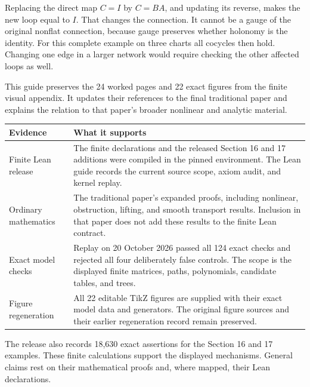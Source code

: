 Replacing the direct map $C=I$ by $C=BA$, and updating its reverse, makes the new loop equal to $I$. That changes the connection. It cannot be a gauge of the original nonflat connection, because gauge preserves whether holonomy is the identity. For this complete example on three charts all cocycles then hold. Changing one edge in a larger network would require checking the other affected loops as well.


This guide preserves the 24 worked pages and 22 exact figures from the finite visual appendix. It updates their references to the final traditional paper and explains the relation to that paper's broader nonlinear and analytic material.

{\small
\begin{tabularx}{\linewidth}{@{}p{.24\linewidth}Y@{}}\toprule
\textbf{Evidence} & \textbf{What it supports}\\\midrule
Finite Lean release & The finite declarations and the released Section 16 and 17 additions were compiled in the pinned environment. The Lean guide records the current source scope, axiom audit, and kernel replay.\\
Ordinary mathematics & The traditional paper's expanded proofs, including nonlinear, obstruction, lifting, and smooth transport results. Inclusion in that paper does not add these results to the finite Lean contract.\\
Exact model checks & Replay on 20 October 2026 passed all 124 exact checks and rejected all four deliberately false controls. The scope is the displayed finite matrices, paths, polynomials, candidate tables, and trees.\\
Figure regeneration & All 22 editable TikZ figures are supplied with their exact model data and generators. The original figure sources and their earlier regeneration record remain preserved.\\\bottomrule
\end{tabularx}}

The release also records 18,630 exact assertions for the Section 16 and 17 examples. These finite calculations support the displayed mechanisms. General claims rest on their mathematical proofs and, where mapped, their Lean declarations.

